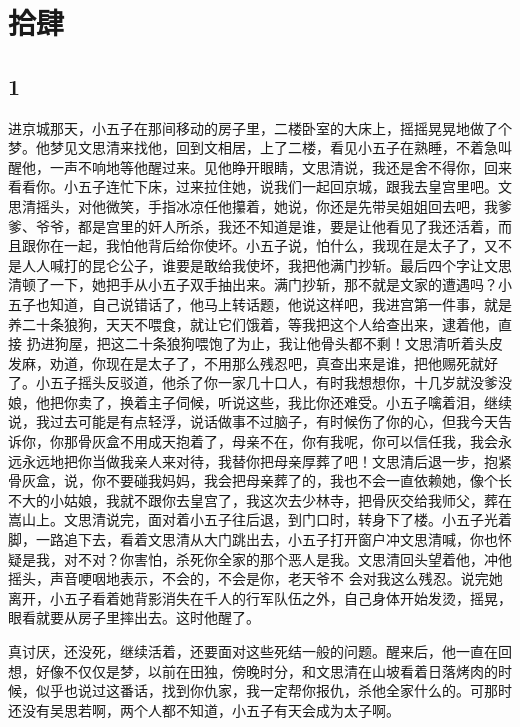 \section{拾肆}

{\centering\subsection{1}}

进京城那天，小五子在那间移动的房子里，二楼卧室的大床上，摇摇晃晃地做了个梦。他梦见文思清来找他，回到文相居，上了二楼，看见小五子在熟睡，不着急叫醒他，一声不响地等他醒过来。见他睁开眼睛，文思清说，我还是舍不得你，回来看看你。小五子连忙下床，过来拉住她，说我们一起回京城，跟我去皇宫里吧。文思清摇头，对他微笑，手指冰凉任他攥着，她说，你还是先带吴姐姐回去吧，我爹爹、爷爷，都是宫里的奸人所杀，我还不知道是谁，要是让他看见了我还活着，而且跟你在一起，我怕他背后给你使坏。小五子说，怕什么，我现在是太子了，又不是人人喊打的昆仑公子，谁要是敢给我使坏，我把他满门抄斩。最后四个字让文思清顿了一下，她把手从小五子双手抽出来。满门抄斩，那不就是文家的遭遇吗？小五子也知道，自己说错话了，他马上转话题，他说这样吧，我进宫第一件事，就是养二十条狼狗，天天不喂食，就让它们饿着，等我把这个人给查出来，逮着他，直接
扔进狗屋，把这二十条狼狗喂饱了为止，我让他骨头都不剩！文思清听着头皮发麻，劝道，你现在是太子了，不用那么残忍吧，真查出来是谁，把他赐死就好了。小五子摇头反驳道，他杀了你一家几十口人，有时我想想你，十几岁就没爹没娘，他把你卖了，换着主子伺候，听说这些，我比你还难受。小五子噙着泪，继续说，我过去可能是有点轻浮，说话做事不过脑子，有时候伤了你的心，但我今天告诉你，你那骨灰盒不用成天抱着了，母亲不在，你有我呢，你可以信任我，我会永远永远地把你当做我亲人来对待，我替你把母亲厚葬了吧！文思清后退一步，抱紧骨灰盒，说，你不要碰我妈妈，我会把母亲葬了的，我也不会一直依赖她，像个长不大的小姑娘，我就不跟你去皇宫了，我这次去少林寺，把骨灰交给我师父，葬在嵩山上。文思清说完，面对着小五子往后退，到门口时，转身下了楼。小五子光着脚，一路追下去，看着文思清从大门跳出去，小五子打开窗户冲文思清喊，你也怀疑是我，对不对？你害怕，杀死你全家的那个恶人是我。文思清回头望着他，冲他摇头，声音哽咽地表示，不会的，不会是你，老天爷不
会对我这么残忍。说完她离开，小五子看着她背影消失在千人的行军队伍之外，自己身体开始发烫，摇晃，眼看就要从房子里摔出去。这时他醒了。

真讨厌，还没死，继续活着，还要面对这些死结一般的问题。醒来后，他一直在回想，好像不仅仅是梦，以前在田独，傍晚时分，和文思清在山坡看着日落烤肉的时候，似乎也说过这番话，找到你仇家，我一定帮你报仇，杀他全家什么的。可那时还没有吴思若啊，两个人都不知道，小五子有天会成为太子啊。

